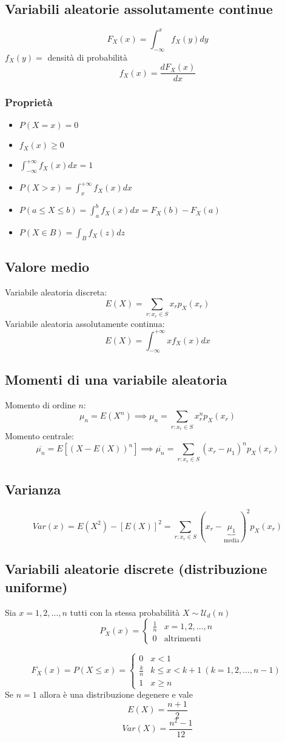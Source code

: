 \subsection*{Variabili aleatorie assolutamente continue}
$$F_X(x) = \int_{-\infty}^{x} f_X(y)dy$$
$f_X(y) = $ densità di probabilità
$$f_X(x) = \frac{dF_X(x)}{dx}$$

\subsubsection*{Proprietà}
\begin{itemize}
    \item $P(X = x) = 0$
    \item $f_X(x) \ge 0$
    \item $\displaystyle \int_{-\infty}^{+\infty}f_X(x)dx=1$
    \item $P(X > x) = \displaystyle \int_{x}^{+\infty}f_X(x)dx$
    \item $P(a \le X \le b) = \displaystyle \int_{a}^{b}f_X(x)dx=F_X(b)-F_X(a)$
    \item $P(X \in B) = \displaystyle \int_{B}f_X(z)dz$
\end{itemize}

\subsection*{Valore medio}
Variabile aleatoria discreta:
$$
E(X) = \sum_{r: x_r \in S}x_r p_X(x_r)
$$
Variabile aleatoria assolutamente continua:
$$
E(X) = \int_{-\infty}^{+\infty}x f_X(x)dx
$$

\subsection*{Momenti di una variabile aleatoria}
Momento di ordine $n$:
$$
\mu_n = E(X^n) \implies \mu_n=\sum_{r: x_r \in S}x_r^n p_X(x_r)
$$
Momento centrale:
$$
\overline{\mu_n} = E[(X-E(X))^n] \implies \overline{\mu_n}=\sum_{r: x_r \in S}(x_r-\mu_1)^n p_X(x_r)
$$

\subsection*{Varianza}
$$
\mathit{Var}(x) = E(X^2) - [E(X)]^2 = \sum_{r: x_r \in S}(x_r - \underbrace{\mu_1}_{\text{media}})^2 p_X(x_r)
$$

\subsection*{Variabili aleatorie discrete (distribuzione uniforme)}
Sia $x = 1,2,\dots,n$ tutti con la stessa probabilità $X \sim \mathscr{U}_d(n) $
$$
P_X(x) =
\begin{cases}
    \frac{1}{n} & x = 1,2,\dots,n\\
    0 & \text {altrimenti}
\end{cases}$$

$$
F_X(x) = P(X \le x) =
\begin{cases}
    0 & x < 1\\
    \frac{k}{n} & k \le x < k + 1 \ (k = 1,2,\dots,n-1)\\
    1 & x \ge n
\end{cases}
$$
Se $n = 1$ allora è una distribuzione degenere e vale
$$
E(X) = \frac{n+1}{2}
$$
$$
\mathit{Var}(X) = \frac{n^2-1}{12}
$$